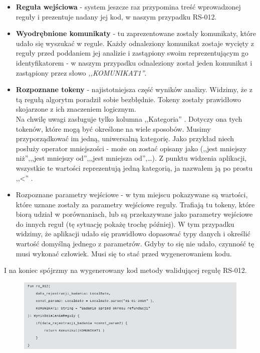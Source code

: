 \begin{itemize}
	\item \textbf{Reguła wejściowa} - system jeszcze raz przypomina treść wprowadzonej reguły i prezentuje nadany jej kod, w naszym przypadku RS-012.
	\item \textbf{Wyodrębnione komunikaty} - tu zaprezentowane zostały komunikaty, które udało się wyszukać w regule. Każdy odnaleziony komunikat zostaje wycięty z reguły przed poddaniem jej analizie i zastąpiony swoim reprezentującym go identyfikatorem - w naszym przypadku odnaleziony został jeden komunikat i zastąpiony przez słowo \textit{,,KOMUNIKAT1''}.
	\item \textbf{Rozpoznane tokeny} - najistotniejsza część wyników analizy. Widzimy, że z tą regułą algorytm poradził sobie bezbłędnie. Tokeny zostały prawidłowo skojarzone z ich znaczeniem logicznym. \\
	Na chwilę uwagi zasługuje tylko kolumna ,,Kategoria'' . Dotyczy ona tych tokenów, które mogą być określone na wiele sposobów. Musimy przyporządkować im jedną, uniwersalną kategorię. Jako przykład niech posłuży operator mniejszości - może on zostać opisany jako (,,jest mniejszy niż'',,,jest mniejszy od'',,,jest mniejsza od'',\dots). Z punktu widzenia aplikacji, wszystkie te wartości reprezentują jedną kategorią, ja nazwałem ją po prostu ,,<'' .
	\item {Rozpoznane parametry wejściowe} - w tym miejscu pokazywane są wartości, które uznane zostały za parametry wejściowe reguły. Trafiają tu tokeny, które biorą udział w porównaniach, lub są przekazywane jako parametry wejściowe do innych reguł (tę sytuację pokażę trochę później). W tym przypadku widzimy, że aplikacji udało się prawidłowo dopasować typy danych i określić wartość domyślną jednego z parametrów. Gdyby to się nie udało, czynność tę musi wykonać człowiek. Musi się to stać przed wygenerowaniem kodu.
\end{itemize}


I na koniec spójrzmy na wygenerowany kod metody walidującej regułę RS-012.
\begin{figure}[H]
	\centering
	\includegraphics[scale=0.8]{img/app-eksperymenty/p1-3.png}
\end{figure}

